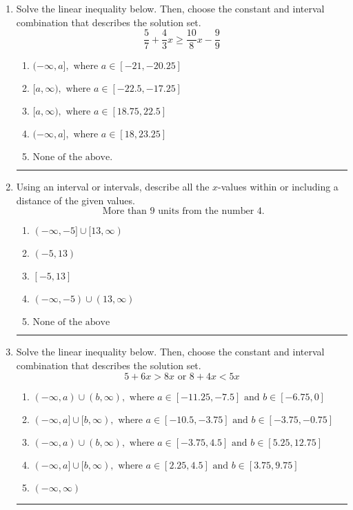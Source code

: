 \documentclass[14pt]{extbook}
\newcommand{\litem}[1]{\item#1\hspace*{-1cm}\rule{\textwidth}{0.4pt}}
\begin{document}
\begin{enumerate}
\litem{
Solve the linear inequality below. Then, choose the constant and interval combination that describes the solution set.\[ \frac{5}{7} + \frac{4}{3} x \geq \frac{10}{8} x - \frac{9}{9} \]\begin{enumerate}[label=\Alph*.]
\item \( (-\infty, a], \text{ where } a \in [-21, -20.25] \)
\item \( [a, \infty), \text{ where } a \in [-22.5, -17.25] \)
\item \( [a, \infty), \text{ where } a \in [18.75, 22.5] \)
\item \( (-\infty, a], \text{ where } a \in [18, 23.25] \)
\item \( \text{None of the above}. \)

\end{enumerate} }
\litem{
Using an interval or intervals, describe all the $x$-values within or including a distance of the given values.\[ \text{ More than } 9 \text{ units from the number } 4. \]\begin{enumerate}[label=\Alph*.]
\item \( (-\infty, -5] \cup [13, \infty) \)
\item \( (-5, 13) \)
\item \( [-5, 13] \)
\item \( (-\infty, -5) \cup (13, \infty) \)
\item \( \text{None of the above} \)

\end{enumerate} }
\litem{
Solve the linear inequality below. Then, choose the constant and interval combination that describes the solution set.\[ 5 + 6 x > 8 x \text{ or } 8 + 4 x < 5 x \]\begin{enumerate}[label=\Alph*.]
\item \( (-\infty, a) \cup (b, \infty), \text{ where } a \in [-11.25, -7.5] \text{ and } b \in [-6.75, 0] \)
\item \( (-\infty, a] \cup [b, \infty), \text{ where } a \in [-10.5, -3.75] \text{ and } b \in [-3.75, -0.75] \)
\item \( (-\infty, a) \cup (b, \infty), \text{ where } a \in [-3.75, 4.5] \text{ and } b \in [5.25, 12.75] \)
\item \( (-\infty, a] \cup [b, \infty), \text{ where } a \in [2.25, 4.5] \text{ and } b \in [3.75, 9.75] \)
\item \( (-\infty, \infty) \)


\end{enumerate}}
\end{enumerate}
\end{document}
